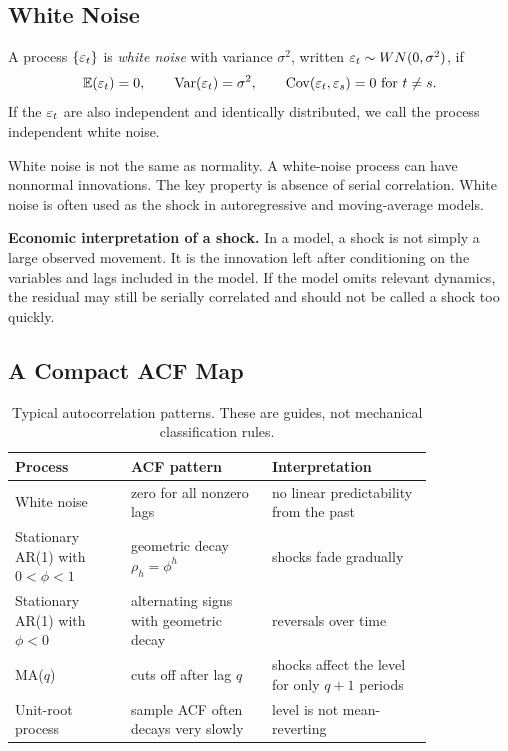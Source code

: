 \subsection{White Noise}
\begin{defN}
A process $\{\varepsilon_t\}$ is \emph{white noise} with variance $\sigma^2$, written $\varepsilon_t\sim WN(0,\sigma^2)$, if
\[
\mathbb{E}(\varepsilon_t)=0,\qquad \operatorname{Var}(\varepsilon_t)=\sigma^2,\qquad \operatorname{Cov}(\varepsilon_t,\varepsilon_s)=0\text{ for }t\neq s.
\]
If the $\varepsilon_t$ are also independent and identically distributed, we call the process independent white noise.
\end{defN}

White noise is not the same as normality. A white-noise process can have nonnormal innovations. The key property is absence of serial correlation. White noise is often used as the shock in autoregressive and moving-average models.

\begin{boxD}
\textbf{Economic interpretation of a shock.}
In a model, a shock is not simply a large observed movement. It is the innovation left after conditioning on the variables and lags included in the model. If the model omits relevant dynamics, the residual may still be serially correlated and should not be called a shock too quickly.
\end{boxD}

\subsection{A Compact ACF Map}
\begin{table}[h]
\centering
\small
\begin{tabular}{p{0.23\linewidth}p{0.28\linewidth}p{0.32\linewidth}}
\toprule
Process & ACF pattern & Interpretation \\
\midrule
White noise & zero for all nonzero lags & no linear predictability from the past \\
Stationary AR(1) with $0<\phi<1$ & geometric decay $\rho_h=\phi^h$ & shocks fade gradually \\
Stationary AR(1) with $\phi<0$ & alternating signs with geometric decay & reversals over time \\
MA($q$) & cuts off after lag $q$ & shocks affect the level for only $q+1$ periods \\
Unit-root process & sample ACF often decays very slowly & level is not mean-reverting \\
\bottomrule
\end{tabular}
\caption{Typical autocorrelation patterns. These are guides, not mechanical classification rules.}
\label{tab:acf_map}
\end{table}

